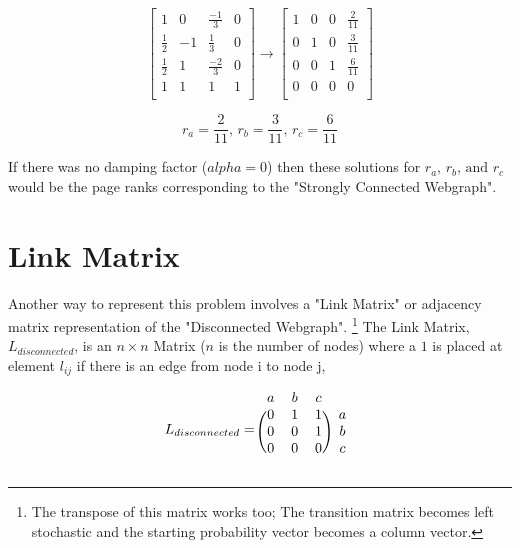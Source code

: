 \documentclass[12pt]{article}
\begin{document}
\[
\left[
\begin{array}{ccc|c}
1 			& 0 	& \frac{-1}{3} &  0 \\
\frac{1}{2} & -1 	& \frac{1}{3} &  0 \\
\frac{1}{2} & 1 	& \frac{-2}{3} &  0 \\
1 			& 1 	& 1 &  1 \\
\end{array}
\right]
%
%
\rightarrow
%
%
\left[
\begin{array}{ccc|c}
1 & 0 	& 0 &  \frac{2}{11} \\
0 & 1 	& 0 &  \frac{3}{11} \\
0 & 0 	& 1 &  \frac{6}{11} \\
0 & 0 	& 0 &  0 \\
\end{array}
\right]
\]

\begin{equation}
	\nonumber r_a = \frac{2}{11}, \, r_b = \frac{3}{11}, \, r_c = \frac{6}{11}
\end{equation}


\iffalse
$$
\begin{pmatrix} 
  1 	& 0 	& \frac{-1}{3}  \\
  0 	& 0 			& 1 		 \\
  \frac{1}{3} 	& \frac{1}{3} 	& \frac{1}{3}
\end{pmatrix}
$$
\fi



If there was no damping factor ($alpha=0$) then these solutions for $r_a, \, r_b, \, \text{and } r_c$ would be the page ranks corresponding to the "Strongly Connected Webgraph". 

\section{Link Matrix}

Another way to represent this problem involves a "Link Matrix" or adjacency matrix representation of the "Disconnected Webgraph". \footnote{The transpose of this matrix works too; The transition matrix becomes left stochastic and the starting probability vector becomes a column vector.} The Link Matrix, $L_{disconnected}$, is an $n \times n$ Matrix ($n$ is the number of nodes) where a $1$ is placed at element $l_{ij}$ if there is an edge from node i to node j,

\[
L_{disconnected} =
\begin{blockarray}{cccc}
a & b & c \\
\begin{block}{(ccc)c}
  0 & 1 & 1 & a \\
  0 & 0 & 1 & b \\
  0 & 0 & 0 & c \\
\end{block}
\end{blockarray}
\]
\end{document}
